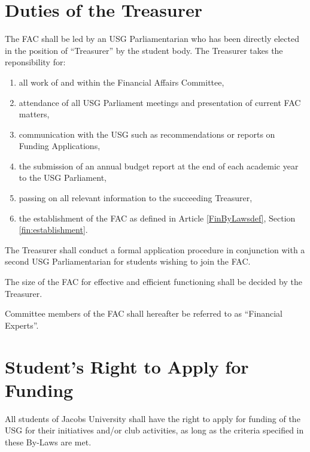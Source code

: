 \section{Duties of the Treasurer}
The FAC shall be led by an USG Parliamentarian who has been directly elected in the position of ``Treasurer'' by the student body. The Treasurer takes the reponsibility for:

\begin{enumerate}
\item all work of and within the Financial Affairs Committee,
\item attendance of all USG Parliament meetings and presentation of current FAC matters,
\item communication with the USG such as recommendations or reports on Funding Applications,
\item the submission of an annual budget report at the end of each academic year to the USG Parliament,
\item passing on all relevant information to the succeeding Treasurer,
\item the establishment of the FAC as defined in Article \ref{FinByLawsdef}, Section \ref{fin:establishment}.
\end{enumerate}

\label{fin:establishment}
\begin{parenum}
\item The Treasurer shall conduct a formal application procedure in conjunction with a second USG Parliamentarian for students wishing to join the FAC.
\item The size of the FAC for effective and efficient functioning shall be decided by the Treasurer. 
\item Committee members of the FAC shall hereafter be referred to as ``Financial Experts''.
\end{parenum}

\section{Student's Right to Apply for Funding}
All students of Jacobs University shall have the right to apply for funding of the USG for their initiatives and/or club activities, as long as the criteria specified in these By-Laws are met.


